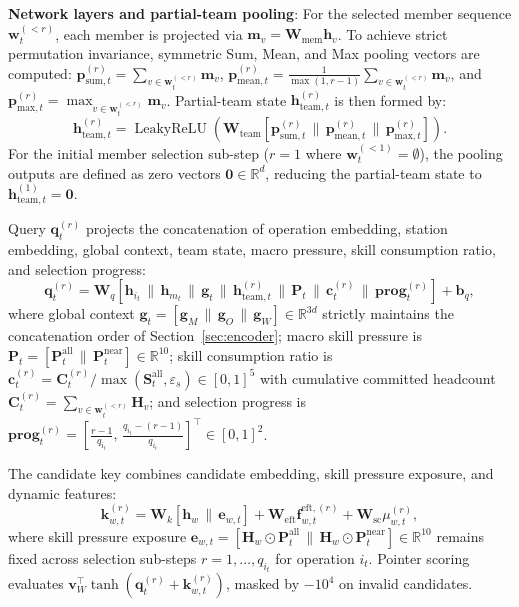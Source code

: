\documentclass[journal,10pt]{IEEEtran}
\begin{document}
\textbf{Network layers and partial-team pooling}:
For the selected member sequence $\mathbf w_t^{(<r)}$, each member is projected via $\mathbf m_v = \mathbf W_{\mathrm{mem}}\mathbf h_v$. To achieve strict permutation invariance, symmetric Sum, Mean, and Max pooling vectors are computed: $\mathbf p_{\mathrm{sum},t}^{(r)} = \sum_{v\in \mathbf w_t^{(<r)}} \mathbf m_v$, $\mathbf p_{\mathrm{mean},t}^{(r)} = \frac{1}{\max(1, r-1)}\sum_{v\in \mathbf w_t^{(<r)}} \mathbf m_v$, and $\mathbf p_{\mathrm{max},t}^{(r)} = \max_{v\in \mathbf w_t^{(<r)}} \mathbf m_v$. Partial-team state $\mathbf h_{\mathrm{team},t}^{(r)}$ is then formed by:
\begin{equation}
\mathbf h_{\mathrm{team},t}^{(r)} = \operatorname{LeakyReLU}\left( \mathbf W_{\mathrm{team}} \left[ \mathbf p_{\mathrm{sum},t}^{(r)} \,\|\, \mathbf p_{\mathrm{mean},t}^{(r)} \,\|\, \mathbf p_{\mathrm{max},t}^{(r)} \right] \right).
\end{equation}
For the initial member selection sub-step ($r=1$ where $\mathbf w_t^{(<1)}=\emptyset$), the pooling outputs are defined as zero vectors $\mathbf 0\in\mathbb R^d$, reducing the partial-team state to $\mathbf h_{\mathrm{team},t}^{(1)}=\mathbf 0$.

Query $\mathbf q_t^{(r)}$ projects the concatenation of operation embedding, station embedding, global context, team state, macro pressure, skill consumption ratio, and selection progress:
\begin{equation}
\mathbf q_t^{(r)}=\mathbf W_q\left[\mathbf h_{i_t}\,\|\,\mathbf h_{m_t}\,\|\,\mathbf g_t\,\|\,\mathbf h_{\mathrm{team},t}^{(r)}\,\|\,\mathbf P_t\,\|\,\mathbf c_t^{(r)}\,\|\,\mathbf{prog}_t^{(r)}\right]+\mathbf b_q,
\end{equation}
where global context $\mathbf g_t = [\mathbf g_M \,\|\, \mathbf g_O \,\|\, \mathbf g_W] \in \mathbb R^{3d}$ strictly maintains the concatenation order of Section~\ref{sec:encoder}; macro skill pressure is $\mathbf P_t = [\mathbf P_t^{\mathrm{all}} \,\|\, \mathbf P_t^{\mathrm{near}}] \in \mathbb R^{10}$; skill consumption ratio is $\mathbf c_t^{(r)} = \mathbf C_t^{(r)} / \max(\mathbf S_t^{\mathrm{all}}, \varepsilon_s) \in [0,1]^5$ with cumulative committed headcount $\mathbf C_t^{(r)} = \sum_{v\in\mathbf w_t^{(<r)}} \mathbf H_v$; and selection progress is $\mathbf{prog}_t^{(r)} = \left[\frac{r-1}{q_{i_t}},\, \frac{q_{i_t}-(r-1)}{q_{i_t}}\right]^\top \in [0,1]^2$.

The candidate key combines candidate embedding, skill pressure exposure, and dynamic features:
\begin{equation}
\mathbf k_{w,t}^{(r)}=\mathbf W_k[\mathbf h_w\,\|\,\mathbf e_{w,t}]+\mathbf W_{\mathrm{eft}}\mathbf f_{w,t}^{\mathrm{eft},(r)}+\mathbf W_{\mathrm{sc}}\mu_{w,t}^{(r)},
\end{equation}
where skill pressure exposure $\mathbf e_{w,t} = [\mathbf H_w \odot \mathbf P_t^{\mathrm{all}} \,\|\, \mathbf H_w \odot \mathbf P_t^{\mathrm{near}}] \in \mathbb R^{10}$ remains fixed across selection sub-steps $r=1,\dots,q_{i_t}$ for operation $i_t$. Pointer scoring evaluates $\mathbf v_W^{\top}\tanh(\mathbf q_t^{(r)}+\mathbf k_{w,t}^{(r)})$, masked by $-10^4$ on invalid candidates.
\end{document}
